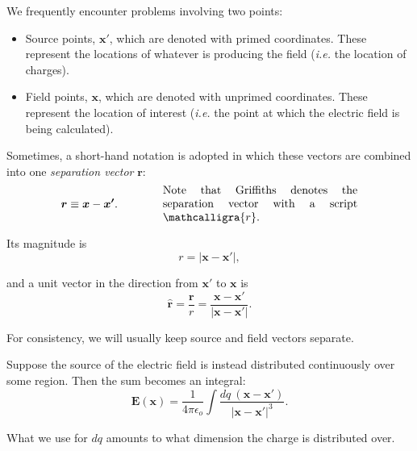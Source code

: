 \documentclass{article}
\numberwithin{equation}{section}
\newcommand{\rhat}{\mathbf{\hat{r}}}
\newcommand{\scripty}[1]{\ensuremath{\mathcalligra{#1}}}
\begin{document}
\begin{mdframed}[backgroundcolor=WHITE,align=left,userdefinedwidth=45em, topline=false, rightline=false,frametitle={Warning on Notation}]

We frequently encounter problems involving two points:
\begin{itemize}

\item Source points, $\bm{x'}$, which are denoted with primed coordinates. These represent the locations of whatever is producing the field (\emph{i.e.} the location of charges).

\item Field points, $\bm{x}$, which are denoted with unprimed coordinates. These represent the location of interest (\emph{i.e.} the point at which the electric field is being calculated).

\end{itemize}

Sometimes, a short-hand notation is adopted in which these vectors are combined into one \emph{separation vector} $\bm{r}$:
\begin{equation*}
    \bm{r} \equiv \bm{x} - \bm{x'}. \qquad\qquad \parbox[c]{0.5\textwidth}{Note that Griffiths denotes the separation vector with a script $\scripty{r}$.}
\end{equation*}

Its magnitude is
\begin{equation*}
    r = \left| \bm{x} - \bm{x'} \right|,
\end{equation*}

and a unit vector in the direction from $\bm{x'}$ to $\bm{x}$ is
\begin{equation*}
    \rhat = \frac{\bm{r}}{r} = \frac{\bm{x} - \bm{x'}}{\left| \bm{x} - \bm{x'} \right|}.
\end{equation*}

For consistency, we will usually keep source and field vectors separate.

\end{mdframed}

Suppose the source of the electric field is instead distributed continuously over some region. Then the sum becomes an integral:
\begin{equation*}
    \bm{E}(\bm{x}) = \frac{1}{4\pi\epsilon_o} \int \frac{dq\ \left( \bm{x} - \bm{x'} \right)}{\left| \bm{x} - \bm{x'} \right|^3}.
\end{equation*}

What we use for $dq$ amounts to what dimension the charge is distributed over.
\end{document}
